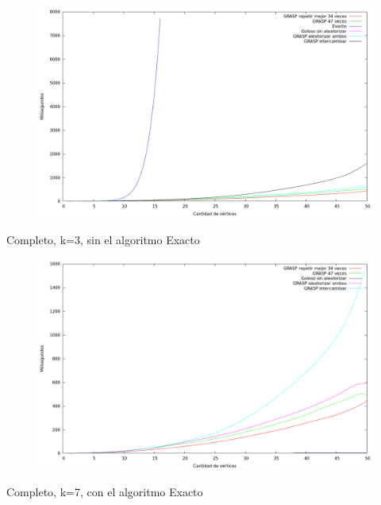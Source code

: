 \begin{figure}[H]
  \begin{center}
    \includegraphics[scale=0.35]{imagenes/ej6-completo-k3-tiempo-exacto.png}
  \end{center}
\end{figure}

Completo, k=3, sin el algoritmo Exacto

\begin{figure}[H]
  \begin{center}
    \includegraphics[scale=0.35]{imagenes/ej6-completo-k3-tiempo.png}
  \end{center}
\end{figure}

Completo, k=7, con el algoritmo Exacto

